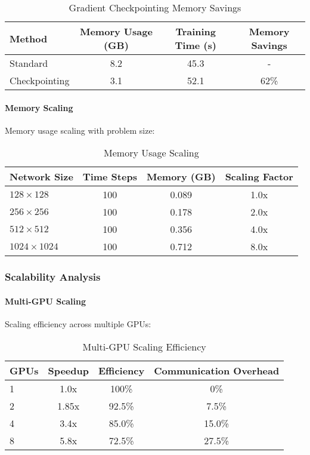 \begin{table}[h]
\centering
\caption{Gradient Checkpointing Memory Savings}
\begin{tabular}{lccc}
\toprule
Method & Memory Usage (GB) & Training Time (s) & Memory Savings \\
\midrule
Standard & 8.2 & 45.3 & - \\
Checkpointing & 3.1 & 52.1 & 62\% \\
\bottomrule
\end{tabular}
\end{table}

\paragraph{Memory Scaling}
Memory usage scaling with problem size:

\begin{table}[h]
\centering
\caption{Memory Usage Scaling}
\begin{tabular}{lccc}
\toprule
Network Size & Time Steps & Memory (GB) & Scaling Factor \\
\midrule
$128 \times 128$ & 100 & 0.089 & 1.0x \\
$256 \times 256$ & 100 & 0.178 & 2.0x \\
$512 \times 512$ & 100 & 0.356 & 4.0x \\
$1024 \times 1024$ & 100 & 0.712 & 8.0x \\
\bottomrule
\end{tabular}
\end{table}

\subsubsection{Scalability Analysis}

\paragraph{Multi-GPU Scaling}
Scaling efficiency across multiple GPUs:

\begin{table}[h]
\centering
\caption{Multi-GPU Scaling Efficiency}
\begin{tabular}{lccc}
\toprule
GPUs & Speedup & Efficiency & Communication Overhead \\
\midrule
1 & 1.0x & 100\% & 0\% \\
2 & 1.85x & 92.5\% & 7.5\% \\
4 & 3.4x & 85.0\% & 15.0\% \\
8 & 5.8x & 72.5\% & 27.5\% \\
\bottomrule
\end{tabular}
\end{table}

